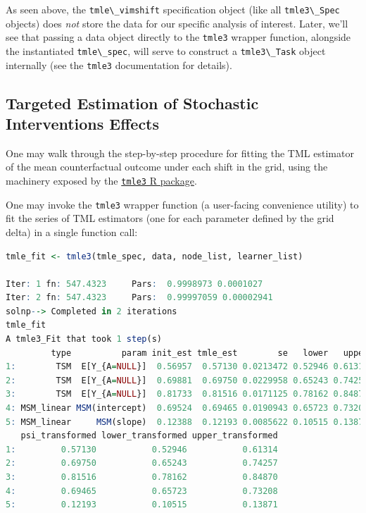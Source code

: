 \documentclass[
  12pt, krantz2,
]{krantz}
\newcommand{\passthrough}[1]{#1}
\newcommand{\1}{\mathbbm{1}}
\theoremstyle{definition}
\theoremstyle{definition}
\theoremstyle{definition}
\theoremstyle{definition}
\theoremstyle{remark}
\begin{document}
As seen above, the \passthrough{\lstinline!tmle\_vimshift!} specification object (like all \passthrough{\lstinline!tmle3\_Spec!}
objects) does \emph{not} store the data for our specific analysis of interest. Later,
we'll see that passing a data object directly to the \passthrough{\lstinline!tmle3!} wrapper function,
alongside the instantiated \passthrough{\lstinline!tmle\_spec!}, will serve to construct a \passthrough{\lstinline!tmle3\_Task!}
object internally (see the \passthrough{\lstinline!tmle3!} documentation for details).

\hypertarget{targeted-estimation-of-stochastic-interventions-effects-1}{%
\subsection{Targeted Estimation of Stochastic Interventions Effects}\label{targeted-estimation-of-stochastic-interventions-effects-1}}

One may walk through the step-by-step procedure for fitting the TML estimator
of the mean counterfactual outcome under each shift in the grid, using the
machinery exposed by the \href{https://tmle3.tlverse.org/}{\passthrough{\lstinline!tmle3!} R package}.

One may invoke the \passthrough{\lstinline!tmle3!} wrapper function (a user-facing convenience utility)
to fit the series of TML estimators (one for each parameter defined by the grid
delta) in a single function call:

\begin{lstlisting}[language=R]
tmle_fit <- tmle3(tmle_spec, data, node_list, learner_list)

Iter: 1 fn: 547.4323     Pars:  0.9998973 0.0001027
Iter: 2 fn: 547.4323     Pars:  0.99997059 0.00002941
solnp--> Completed in 2 iterations
tmle_fit
A tmle3_Fit that took 1 step(s)
         type          param init_est tmle_est        se   lower   upper
1:        TSM  E[Y_{A=NULL}]  0.56957  0.57130 0.0213472 0.52946 0.61314
2:        TSM  E[Y_{A=NULL}]  0.69881  0.69750 0.0229958 0.65243 0.74257
3:        TSM  E[Y_{A=NULL}]  0.81733  0.81516 0.0171125 0.78162 0.84870
4: MSM_linear MSM(intercept)  0.69524  0.69465 0.0190943 0.65723 0.73208
5: MSM_linear     MSM(slope)  0.12388  0.12193 0.0085622 0.10515 0.13871
   psi_transformed lower_transformed upper_transformed
1:         0.57130           0.52946           0.61314
2:         0.69750           0.65243           0.74257
3:         0.81516           0.78162           0.84870
4:         0.69465           0.65723           0.73208
5:         0.12193           0.10515           0.13871
\end{lstlisting}
\end{document}
